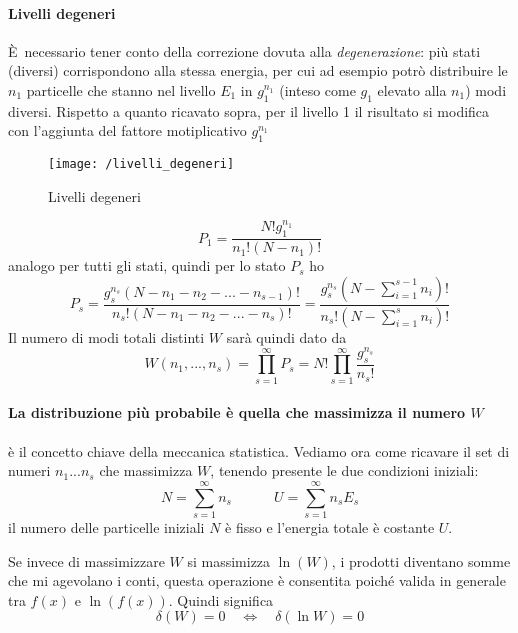 \paragraph{Livelli degeneri}
È necessario tener conto della correzione dovuta alla \textit{degenerazione}: più stati (diversi) corrispondono alla stessa energia, per cui ad esempio potrò distribuire le $n_1$ particelle che stanno nel livello $E_1$ in $g_1^{n_1}$ (inteso come $g_1$ elevato alla $n_1$) modi diversi.
Rispetto a quanto ricavato sopra, per il livello 1 il risultato si modifica con l'aggiunta del fattore motiplicativo $g_1^{n_1}$
\begin{figure}[h]
\centering
\texttt{[image: /livelli\_degeneri]}
\caption{Livelli degeneri}
\label{esempio_partizione}
\end{figure}
\begin{equation}
P_1 = \frac{ N! g_1^{n_1}}{n_1! (N-n_1)! }
\end{equation}
analogo per tutti gli stati, quindi per lo stato $P_s$ ho
\begin{equation}
P_s = \frac{g_s^{n_s}(N-n_1 - n_2 - ... - n_{s-1})!}{n_s! ( N - n_1 - n_2 - ... - n_{s})!}
= \frac{g_s^{n_s}(N- \sum_{i=1}^{s-1}n_i )!}{n_s! ( N - \sum_{i=1}^{s}n_i )!}
\end{equation}
Il numero di modi totali distinti $W$ sarà quindi dato da
\begin{equation}
W(n_1,...,n_s) = \prod_{s=1}^{\infty} P_s = N! \prod_{s=1}^{\infty}\frac{ g_s^{n_s}}{ n_s!}
\end{equation}

\paragraph{La distribuzione più probabile è quella che massimizza il numero $W$} è il concetto chiave della meccanica statistica.
Vediamo ora come ricavare il set di numeri $n_1 ... n_s$ che massimizza $W$, tenendo presente le due condizioni iniziali: 
\begin{equation}
N  =  \sum_{s=1}^{\infty} n_s 
\quad\quad\quad
U =  \sum_{s=1}^{\infty} n_s E_s
\end{equation}
il numero delle particelle iniziali $N$ è fisso e l'energia totale è costante $U$.

Se invece di massimizzare $W$ si massimizza $\ln(W)$, i prodotti diventano somme che mi agevolano i conti, questa operazione è consentita poiché valida in generale tra $f(x)$ e $\ln(f(x))$.
Quindi significa
\begin{equation}
\delta ( W) = 0 \quad \Leftrightarrow  \quad \delta (\ln W) = 0
\end{equation}

